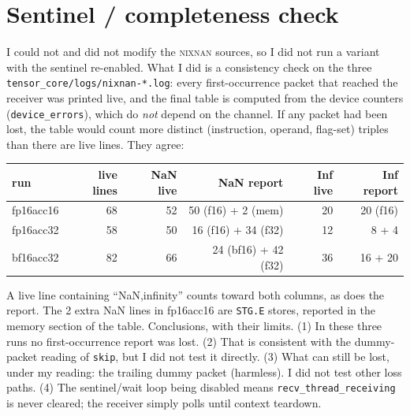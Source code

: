 \documentclass[11pt]{article}
\newcommand{\nn}{\textsc{nixnan}}
\begin{document}
\section{Sentinel / completeness check}\label{sec:sentinel}
I could not and did not modify the \nn{} sources, so I did not run a variant with the sentinel re-enabled. What I did is a consistency check on the three \texttt{tensor\_core/logs/nixnan-*.log}: every first-occurrence packet that reached the receiver was printed live, and the final table is computed from the device counters (\texttt{device\_errors}), which do \emph{not} depend on the channel. If any packet had been lost, the table would count more distinct (instruction, operand, flag-set) triples than there are live lines. They agree:
\begin{center}\begin{tabular}{lrrrrr}\toprule run & live lines & NaN live & NaN report & Inf live & Inf report\\\midrule
fp16acc16 & 68 & 52 & 50 (f16) + 2 (mem) & 20 & 20 (f16)\\
fp16acc32 & 58 & 50 & 16 (f16) + 34 (f32) & 12 & 8 + 4\\
bf16acc32 & 82 & 66 & 24 (bf16) + 42 (f32) & 36 & 16 + 20\\\bottomrule\end{tabular}\end{center}
A live line containing ``NaN,infinity'' counts toward both columns, as does the report. The 2 extra NaN lines in fp16acc16 are \texttt{STG.E} stores, reported in the memory section of the table.
Conclusions, with their limits. (1) In these three runs no first-occurrence report was lost. (2) That is consistent with the dummy-packet reading of \texttt{skip}, but I did not test it directly. (3) What can still be lost, under my reading: the trailing dummy packet (harmless). I did not test other loss paths. (4) The sentinel/wait loop being disabled means \texttt{recv\_thread\_receiving} is never cleared; the receiver simply polls until context teardown.
\end{document}
